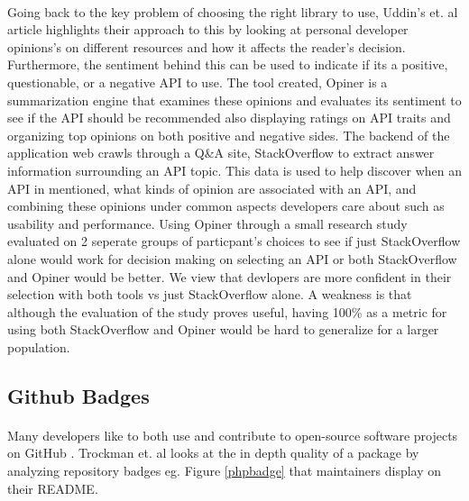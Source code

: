 \documentclass[12pt]{article}
\begin{document}
\paragraph{}
Going back to the key problem of choosing the right library to use, Uddin's et. al \cite{opinerarticle} article
highlights their approach to this by looking at personal developer opinions's on different resources
and how it affects the reader's decision. Furthermore, the sentiment behind this can be used to indicate if its 
a positive, questionable, or a negative API to use. The tool created, Opiner \cite{opiner} is a summarization engine
that examines these opinions and evaluates its sentiment to see if the API should be recommended also displaying ratings on API traits
and organizing top opinions on both positive and negative sides. 
The backend of the application web crawls through a Q\&A site, StackOverflow \cite{stackoverflow} to extract answer
information surrounding an API topic. This data is used to help discover when an API in mentioned, what kinds of opinion
are associated with an API, and combining these opinions under common aspects developers care about such as usability and performance.
Using Opiner \cite{opiner} through a small research study evaluated on 2 seperate groups of particpant's choices to see if 
just StackOverflow \cite{stackoverflow} alone would work for decision making on selecting an API or both StackOverflow and Opiner would be better.
We view that devlopers are more confident in their selection with both tools vs just StackOverflow alone. 
A weakness is that although the evaluation of the study proves useful, having 100\% as a metric for using both StackOverflow and Opiner
would be hard to generalize for a larger population. 

\subsection{Github Badges}
\paragraph{}
Many developers like to both use and contribute to open-source software projects on GitHub \cite{github}. 
Trockman et. al \cite{githubbadges} looks at the in depth quality of a package by analyzing repository badges eg. Figure \ref{phpbadge} that maintainers display on their README.
\end{document}
